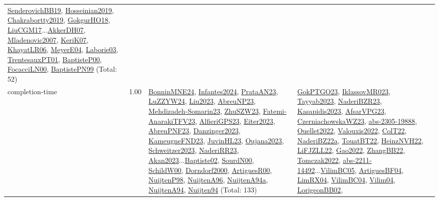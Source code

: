 {\begin{longtable}{p{3cm}r>{\raggedright\arraybackslash}p{6cm}>{\raggedright\arraybackslash}p{6cm}>{\raggedright\arraybackslash}p{8cm}}
\hyperref[detail:SenderovichBB19]{SenderovichBB19}, \hyperref[detail:Hosseinian2019]{Hosseinian2019}, \hyperref[detail:Chakrabortty2019]{Chakrabortty2019}, \hyperref[detail:GokgurHO18]{GokgurHO18}, \hyperref[detail:LiuCGM17]{LiuCGM17}...\hyperref[detail:AkkerDH07]{AkkerDH07}, \hyperref[detail:Mladenovic2007]{Mladenovic2007}, \hyperref[detail:KeriK07]{KeriK07}, \hyperref[detail:KhayatLR06]{KhayatLR06}, \hyperref[detail:MeyerE04]{MeyerE04}, \hyperref[detail:Laborie03]{Laborie03}, \hyperref[detail:TrentesauxPT01]{TrentesauxPT01}, \hyperref[detail:BaptisteP00]{BaptisteP00}, \hyperref[detail:FocacciLN00]{FocacciLN00}, \hyperref[detail:BaptistePN99]{BaptistePN99} (Total: 52)\\
\index{completion-time}\index{Concepts!completion-time}completion-time &  1.00 & \hyperref[detail:BonninMNE24]{BonninMNE24}, \hyperref[detail:Infantes2024]{Infantes2024}, \hyperref[detail:PrataAN23]{PrataAN23}, \hyperref[detail:LuZZYW24]{LuZZYW24}, \hyperref[detail:Liu2023]{Liu2023}, \hyperref[detail:AbreuNP23]{AbreuNP23}, \hyperref[detail:Mehdizadeh-Somarin23]{Mehdizadeh-Somarin23}, \hyperref[detail:ZhuSZW23]{ZhuSZW23}, \hyperref[detail:Fatemi-AnarakiTFV23]{Fatemi-AnarakiTFV23}, \hyperref[detail:AlfieriGPS23]{AlfieriGPS23}, \hyperref[detail:Eiter2023]{Eiter2023}, \hyperref[detail:AbreuPNF23]{AbreuPNF23}, \hyperref[detail:Danzinger2023]{Danzinger2023}, \hyperref[detail:KameugneFND23]{KameugneFND23}, \hyperref[detail:JuvinHL23]{JuvinHL23}, \hyperref[detail:Oujana2023]{Oujana2023}, \hyperref[detail:Schweitzer2023]{Schweitzer2023}, \hyperref[detail:NaderiRR23]{NaderiRR23}, \hyperref[detail:Akan2023]{Akan2023}...\hyperref[detail:Baptiste02]{Baptiste02}, \hyperref[detail:SourdN00]{SourdN00}, \hyperref[detail:SchildW00]{SchildW00}, \hyperref[detail:Dorndorf2000]{Dorndorf2000}, \hyperref[detail:ArtiguesR00]{ArtiguesR00}, \hyperref[detail:NuijtenP98]{NuijtenP98}, \hyperref[detail:NuijtenA96]{NuijtenA96}, \hyperref[detail:NuijtenA94a]{NuijtenA94a}, \hyperref[detail:NuijtenA94]{NuijtenA94}, \hyperref[detail:Nuijten94]{Nuijten94} (Total: 133) & \hyperref[detail:GokPTGO23]{GokPTGO23}, \hyperref[detail:IklassovMR023]{IklassovMR023}, \hyperref[detail:Tayyab2023]{Tayyab2023}, \hyperref[detail:NaderiBZR23]{NaderiBZR23}, \hyperref[detail:Kasapidis2023]{Kasapidis2023}, \hyperref[detail:AfsarVPG23]{AfsarVPG23}, \hyperref[detail:CzerniachowskaWZ23]{CzerniachowskaWZ23}, \hyperref[detail:abs-2305-19888]{abs-2305-19888}, \hyperref[detail:Ouellet2022]{Ouellet2022}, \hyperref[detail:Valouxis2022]{Valouxis2022}, \hyperref[detail:ColT22]{ColT22}, \hyperref[detail:NaderiBZ22a]{NaderiBZ22a}, \hyperref[detail:TouatBT22]{TouatBT22}, \hyperref[detail:HeinzNVH22]{HeinzNVH22}, \hyperref[detail:LiFJZLL22]{LiFJZLL22}, \hyperref[detail:Gao2022]{Gao2022}, \hyperref[detail:ZhangBB22]{ZhangBB22}, \hyperref[detail:Tomczak2022]{Tomczak2022}, \hyperref[detail:abs-2211-14492]{abs-2211-14492}...\hyperref[detail:VilimBC05]{VilimBC05}, \hyperref[detail:ArtiguesBF04]{ArtiguesBF04}, \hyperref[detail:LimRX04]{LimRX04}, \hyperref[detail:VilimBC04]{VilimBC04}, \hyperref[detail:Vilim04]{Vilim04}, \hyperref[detail:LorigeonBB02]{LorigeonBB02}, 
\end{longtable}}
